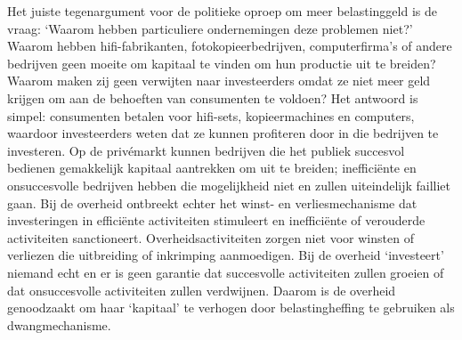 \documentclass[
  a5paper,
  smalldemyvopaper,10pt,twoside,onecolumn,openright,extrafontsizes,hidelinks]{memoir}
\begin{document}
Het juiste tegenargument voor de politieke oproep om meer belastinggeld
is de vraag: `Waarom hebben particuliere ondernemingen deze problemen
niet?' Waarom hebben hifi-fabrikanten, fotokopieerbedrijven,
computerfirma's of andere bedrijven geen moeite om kapitaal te vinden om
hun productie uit te breiden? Waarom maken zij geen verwijten naar
investeerders omdat ze niet meer geld krijgen om aan de behoeften van
consumenten te voldoen? Het antwoord is simpel: consumenten betalen voor
hifi-sets, kopieermachines en computers, waardoor investeerders weten
dat ze kunnen profiteren door in die bedrijven te investeren. Op de
privémarkt kunnen bedrijven die het publiek succesvol bedienen
gemakkelijk kapitaal aantrekken om uit te breiden; inefficiënte en
onsuccesvolle bedrijven hebben die mogelijkheid niet en zullen
uiteindelijk failliet gaan. Bij de overheid ontbreekt echter het winst-
en verliesmechanisme dat investeringen in efficiënte activiteiten
stimuleert en inefficiënte of verouderde activiteiten sanctioneert.
Overheidsactiviteiten zorgen niet voor winsten of verliezen die
uitbreiding of inkrimping aanmoedigen. Bij de overheid `investeert'
niemand echt en er is geen garantie dat succesvolle activiteiten zullen
groeien of dat onsuccesvolle activiteiten zullen verdwijnen. Daarom is
de overheid genoodzaakt om haar `kapitaal' te verhogen door
belastingheffing te gebruiken als dwangmechanisme.
\end{document}
